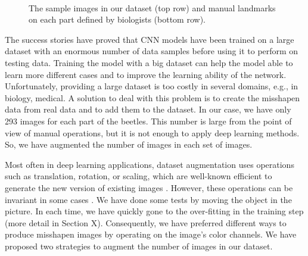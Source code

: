 \documentclass[review]{elsarticle}
\begin{document}
\begin{figure}[h!]
~~
~~
~\\
    \caption{The sample images in our dataset (top row) and manual landmarks on each part defined by biologists (bottom row).}
    \label{figdatasamples}
\end{figure}

The success stories \cite{} have proved that CNN models have been trained on a large dataset with an enormous number of data samples before using it to perform on testing data. Training the model with a big dataset can help the model able to learn more different cases and to improve the learning ability of the network. Unfortunately, providing a large dataset is too costly in several domains, e.g., in biology, medical. A solution to deal with this problem is to create the misshapen data from real data and to add them to the dataset. In our case, we have only 293 images for each part of the beetles. This number is large from the point of view of manual operations, but it is not enough to apply deep learning methods. So, we have augmented the number of images in each set of images.

Most often in deep learning applications, dataset augmentation uses operations such as translation, rotation, or scaling, which are well-known efficient to generate the new version of existing images \cite{}. However, these operations can be invariant in some cases \cite{}. We have done some tests by moving the object in the picture. In each time, we have quickly gone to the over-fitting in the training step (more detail in Section X). Consequently, we have preferred different ways to produce misshapen images by operating on the image's color channels. We have proposed two strategies to augment the number of images in our dataset.
\end{document}
